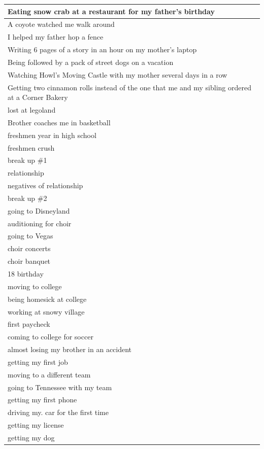 \documentclass[
  .7em,
  letterpaper,
  DIV=11,
  numbers=noendperiod]{scrartcl}
\begin{document}
\begin{table}
\begin{tabular}{l}
\hline
Eating snow crab at a restaurant for my father's birthday\\
\hline
A coyote watched me walk around\\
\hline
I helped my father hop a fence\\
\hline
Writing 6 pages of a story in an hour on my mother's laptop\\
\hline
Being followed by a pack of street dogs on a vacation\\
\hline
Watching Howl's Moving Castle with my mother several days in a row\\
\hline
Getting two cinnamon rolls instead of the one that me and my sibling ordered at a Corner Bakery\\
\hline
lost at legoland\\
\hline
Brother coaches me in basketball\\
\hline
freshmen year in high school\\
\hline
freshmen crush\\
\hline
break up \#1\\
\hline
relationship\\
\hline
negatives of relationship\\
\hline
break up \#2\\
\hline
going to Disneyland\\
\hline
auditioning for choir\\
\hline
going to Vegas\\
\hline
choir concerts\\
\hline
choir banquet\\
\hline
18 birthday\\
\hline
moving to college\\
\hline
being homesick at college\\
\hline
working at snowy village\\
\hline
first paycheck\\
\hline
coming to college for soccer\\
\hline
almost losing my brother in an accident\\
\hline
getting my first job\\
\hline
moving to a different team\\
\hline
going to Tennessee with my team\\
\hline
getting my first phone\\
\hline
driving my. car for the first time\\
\hline
getting my license\\
\hline
getting my dog\\

\end{tabular}
\end{table}
\end{document}
